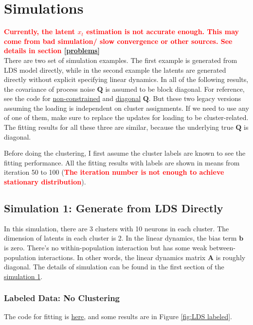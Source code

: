 \documentclass[]{article}
\begin{document}
\section{Simulations}
\textcolor{red}{\textbf{Currently, the latent \(x_t\) estimation is not accurate enough. This may come from bad simulation/ slow convergence or other sources. See details in section \ref{problems}}}\\

There are two set of simulation examples. The first example is generated from LDS model directly, while in the second example the latents are generated directly without explicit specifying linear dynamics. In all of the following results, the covariance of process noise \(\mathbf{Q}\) is assumed to be block diagonal. For reference, see the code for \href{https://github.com/weigcdsb/state-space-clustering/blob/main/LDS/old_example/sim_LDS_noConstraint.m}{non-constrained} and \href{https://github.com/weigcdsb/state-space-clustering/blob/main/LDS/old_example/sim_LDS_diag.m}{diagonal} \(\mathbf{Q}\). But these two legacy versions assuming the loading is independent on cluster assignments. If we need to use any of one of them, make sure to replace the updates for loading to be cluster-related. The fitting results for all these three are similar, because the underlying true \(\mathbf{Q}\) is diagonal.

Before doing the clustering, I first assume the cluster labels are known to see the fitting performance. All the fitting results with labels are shown in means from iteration 50 to 100 (\textcolor{red}{\textbf{The iteration number is not enough to achieve stationary distribution}}).

\subsection{Simulation 1: Generate from LDS Directly}
In this simulation, there are 3 clusters with 10 neurons in each cluster. The dimension of latents in each cluster is 2. In the linear dynamics, the bias term \(\mathbf{b}\) is zero. There's no within-population interaction but has some weak between-population interactions. In other words, the linear dynamics matrix \(\mathbf{A}\) is roughly diagonal. The details of simulation can be found in the first section of the \href{https://github.com/weigcdsb/state-space-clustering/blob/main/LDS/lds_sample.m}{simulation 1}.

\subsubsection{Labeled Data: No Clustering}
The code for fitting is \href{https://github.com/weigcdsb/state-space-clustering/blob/main/LDS/lds_sample.m}{here}, and some results are in Figure \ref{fig:LDS labeled}.
\end{document}
